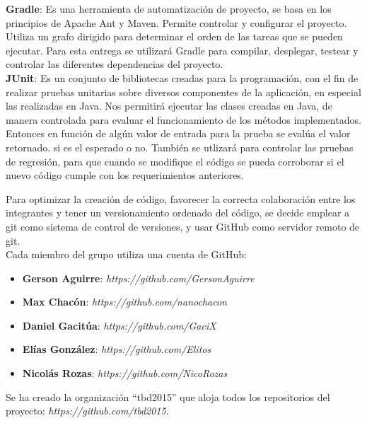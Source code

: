 \documentclass{memoria}
\begin{document}
\textbf{Gradle}: Es una herramienta de automatización de proyecto, se basa en los principios de Apache Ant y Maven. Permite controlar y configurar el proyecto. Utiliza un grafo dirigido para determinar el orden de las tareas que se pueden ejecutar. Para esta entrega se utilizará Gradle para compilar, desplegar, testear y controlar las diferentes dependencias del proyecto.\\

\textbf{JUnit}: Es un conjunto de bibliotecas creadas para la programación, con el fin de realizar pruebas unitarias sobre diversos componentes de la aplicación, en especial las realizadas en Java. Nos permitirá ejecutar las clases creadas en Java, de manera controlada para evaluar el funcionamiento de los métodos implementados. Entonces en función de algún valor de entrada para la prueba se evalúa el valor retornado. si es el esperado o no. También se utlizará para controlar las pruebas de regresión, para que cuando se modifique el código se pueda corroborar si el nuevo código cumple con los requerimientos anteriores.\\

\newpage

    
Para optimizar la creación de código, favorecer la correcta colaboración entre los integrantes y tener un versionamiento ordenado del código, se decide emplear a git como sistema de control de versiones, y usar GitHub como servidor remoto de git.\\

Cada miembro del grupo utiliza una cuenta de GitHub:

\begin{itemize}
	\item \textbf{Gerson Aguirre}: \textsl{https://github.com/GersonAguirre}
	\item \textbf{Max Chacón}: \textsl{https://github.com/nanochacon}
	\item \textbf{Daniel Gacitúa}: \textsl{https://github.com/GaciX}
	\item \textbf{Elías González}: \textsl{https://github.com/Elitos}
	\item \textbf{Nicolás Rozas}: \textsl{https://github.com/NicoRozas}
\end{itemize}

Se ha creado la organización “tbd2015” que aloja todos los repositorios del proyecto: \textsl{https://github.com/tbd2015}.\\
\end{document}
